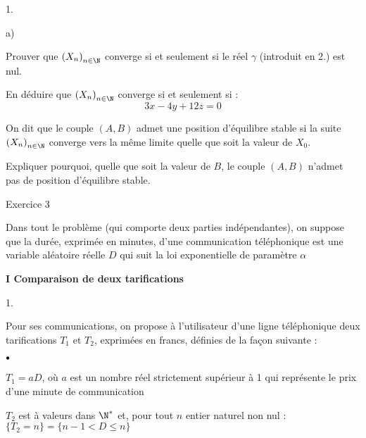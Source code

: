 \documentclass[11pt]{article}%
\begin{document}
\begin{noliste}{1.}
\begin{noliste}{a)}
 \setlength{\itemsep}{2mm}
\item Prouver que $\left( X_{n}\right)_{n\in \N}$ converge si et
seulement si le réel $\gamma $ (introduit en 2.) est nul.

\item En déduire que $\left( X_{n}\right)_{n\in \N}$ converge
si et seulement si : 
\[
3x-4y + 12z = 0 
\]
\end{noliste}

\item On dit que le couple $(A,B)$ admet une position d'équilibre
stable
si la suite $\left( X_{n}\right)_{n\in \N}$ converge vers la même
limite quelle que soit la valeur de $X_{0}$.
\end{noliste}

Expliquer pourquoi, quelle que soit la valeur de $B$, le couple $\left(
A,B\right) $ n'admet pas de position d'équilibre stable.

\begin{center}
{\Large Exercice 3}
\end{center}

Dans tout le problème (qui comporte deux parties indépendantes), on
suppose que la durée, exprimée en minutes, d'une communication
téléphonique est une variable aléatoire réelle $D$ qui suit la loi
exponentielle de paramètre $\alpha $

\textbf{I Comparaison de deux tarifications}

\begin{noliste}{1.}
 \setlength{\itemsep}{4mm}
\item Pour ses communications, on propose à l'utilisateur d'une ligne
téléphonique deux tarifications $T_{1}$ et $T_{2}$, exprimées en
francs, définies de la façon suivante :
\end{noliste}

\begin{noliste}{$\scriptstyle \bullet$}
\item $T_{1} = aD$, où $a$ est un nombre réel strictement supérieur à 1
qui représente le prix d'une minute de communication

\item $T_{2}$ est à valeurs dans $\N^{*}$ et, pour tout $n$
entier naturel non nul : $\{T_{2} = n\} = \{n-1<D\leq n\}$
\end{noliste}
\end{document}
